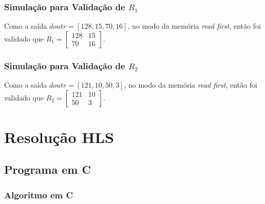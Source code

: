 \documentclass{beamer}
\begin{document}
    \begin{frame}
        \frametitle{Simulação para Validação de $ R_1 $}

        \begingroup {}
            Como a saída $ doutr = [128, 15, 70, 16] $, 
            no modo da memória \textit{read first}, então
            foi validado que $ R_1 = \begin{bmatrix} 128 & 15 \\ 70 & 16 \end{bmatrix} $.
        \endgroup

        \begin{figure}[h] 
            \centering
          \end{figure}
    \end{frame}

    \begin{frame}
        \frametitle{Simulação para Validação de $ R_2 $}

        \begingroup {}
            Como a saída $ doutr = [121, 10, 50, 3] $, 
            no modo da memória \textit{read first}, então
            foi validado que $ R_2 = \begin{bmatrix} 121 & 10 \\ 50 & 3 \end{bmatrix} $.
        \endgroup

        \begin{figure}[h] 
            \centering
          \end{figure}
    \end{frame}

    \section{Resolução HLS}
    \subsection{Programa em C}
    \begin{frame}[fragile]
        \frametitle{Algoritmo em C}

    \end{frame}
\end{document}
